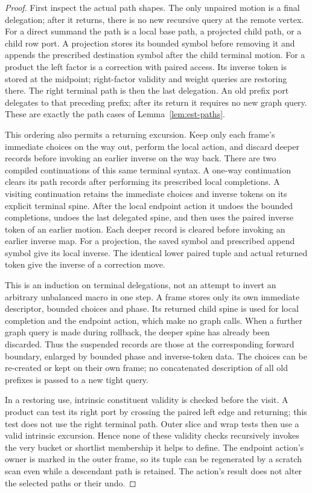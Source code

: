 \documentclass[11pt]{article}
\numberwithin{equation}{section}
\theoremstyle{definition}
\theoremstyle{remark}
\begin{document}
\begin{proof}
First inspect the actual path shapes. The only unpaired motion is a final delegation; after it returns, there is no new recursive query at the remote vertex. For a direct summand the path is a local base path, a projected child
path, or a child row port.  A projection stores its bounded symbol
before removing it and appends the prescribed destination symbol after
the child terminal motion.  For a product the left factor is a
correction with paired access.  Its inverse token is stored at the
midpoint; right-factor validity and weight queries are restoring there.
The right terminal path is then the last delegation.  An old prefix
port delegates to that preceding prefix; after its return it requires
no new graph query.  These are exactly the path cases of
Lemma~\ref{lem:est-paths}.

This ordering also permits a returning excursion. Keep only each frame's immediate choices on the way out, perform the local action, and discard deeper records before invoking an earlier inverse on the way back. There are two compiled continuations of this same terminal syntax.  A
one-way continuation clears its path records after performing its
prescribed local completions.  A visiting continuation retains the
immediate choices and inverse tokens on its explicit terminal spine.
After the local endpoint action it undoes the bounded completions,
undoes the last delegated spine, and then uses the paired inverse token
of an earlier motion.  Each deeper record is cleared before invoking an
earlier inverse map.  For a projection, the saved symbol and prescribed
append symbol give its local inverse.  The identical lower paired tuple
and actual returned token give the inverse of a correction move.

This is an induction on terminal delegations, not an attempt to invert
an arbitrary unbalanced macro in one step.  A frame stores only its own
immediate descriptor, bounded choices and phase.  Its returned child
spine is used for local completion and the endpoint action, which make
no graph calls.  When a further graph query is made during rollback,
the deeper spine has already been discarded.  Thus the suspended
records are those at the corresponding forward boundary, enlarged by
bounded phase and inverse-token data.  The choices can be re-created or
kept on their own frame; no concatenated description of all old
prefixes is passed to a new tight query.

In a restoring use, intrinsic constituent validity is checked before
the visit.  A product can test its right port by crossing the paired
left edge and returning; this test does not use the right terminal
path.  Outer slice and wrap tests then use a valid intrinsic excursion.
Hence none of these validity checks recursively invokes the very
bucket or shortlist membership it helps to define.  The endpoint
action's owner is marked in the outer frame, so its tuple can be
regenerated by a scratch scan even while a descendant path is retained.
The action's result does not alter the selected paths or their undo.
\end{proof}
\end{document}
